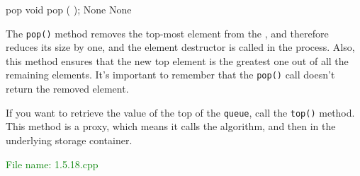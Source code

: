 \begin{methodinfo}
  {pop}
  {void pop ( );}
  {None}
  {None}
  {The \texttt{pop()} method removes the top-most element from the , 
  and therefore reduces its size by one, and the element destructor is called in the process. Also, 
  this method ensures that the new top element is the greatest one out of all the remaining elements. 
  It’s important to remember that the \texttt{pop()} call doesn’t return the removed element.

  If you want to retrieve the value of the top of the \texttt{queue}, call the \texttt{top()} method. 
  This method is a proxy, which means it calls the  algorithm, and 
  then  in the underlying storage container.}
\end{methodinfo}

\textcolor{green}{File name: 1.5.18.cpp}

